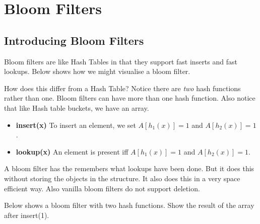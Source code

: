 
\chapter{Bloom Filters}


\section{Introducing Bloom Filters}

Bloom filters are like Hash Tables in that they support 
fast inserts and fast lookups. Below shows how we might 
visualise a bloom filter.


How does this differ from a Hash Table?
Notice there are \textit{two} hash functions rather than one.
Bloom filters can have more than one hash function. 
Also notice that like Hash table buckets, we have an array. 

\begin{itemize}   
\renewcommand{\labelitemi}{$\Box$}
\item \textbf{insert(x)} To insert an element, we set 
$A[h_1(x)] = 1$ and $A[h_2(x)] = 1$.
\item \textbf{lookup(x)}  An element is present iff 
$A[h_1(x)] = 1$ and $A[h_2(x)] = 1$.
\end{itemize}


A bloom filter has the remembers what lookups have been done.
But it does this without storing the objects in the structure.
It also does this in a very space efficient way. 
Also vanilla bloom filters do not support deletion.


\begin{example}
Below shows a bloom filter with two hash functions.
Show the result of the array after insert(1).
\end{example}



